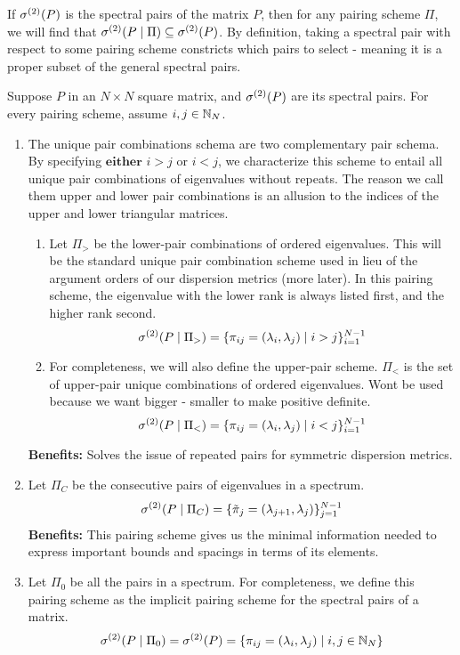 \begin{remark} If ${\sigma^{(2)}}(P)$ is the spectral pairs of the matrix $P$, then for any pairing scheme $\Pi$, we will find that ${\sigma^{(2)}}(P \mid \Pi) \subseteq {\sigma^{(2)}}(P)$. By definition, taking a spectral pair with respect to some pairing scheme constricts which pairs to select - meaning it is a proper subset of the general spectral pairs.
\end{remark}

\newpage
{}

\noindent Suppose $P$ in an $N \times N$ square matrix, and ${\sigma^{(2)}}(P)$ are its spectral pairs. For every pairing scheme, assume $i,j \in \mathbb{N}_N$.

\begin{enumerate}
  \item The unique pair combinations schema are two complementary pair schema. By specifying $\textbf{either}$ $i > j$ or $i < j$, we characterize this scheme to entail all unique pair combinations of eigenvalues without repeats. The reason we call them upper and lower pair combinations is an allusion to the indices of the upper and lower triangular matrices. \begin{enumerate}
    \item Let $\Pi_>$ be the lower-pair combinations of ordered eigenvalues. This will be the standard unique pair combination scheme used in lieu of the argument orders of our dispersion metrics (more later). In this pairing scheme, the eigenvalue with the lower rank is always listed first, and the higher rank second.
    $${\sigma^{(2)}}(P \mid \Pi_>) = \{\pi_{ij} = (\lambda_i,\lambda_j) \mid i > j\}_{i = 1}^{N-1}$$
    \item For completeness, we will also define the upper-pair scheme. $\Pi_<$ is the set of upper-pair unique combinations of ordered eigenvalues. Wont be used because we want bigger - smaller to make positive definite.
    $${\sigma^{(2)}}(P \mid \Pi_<) = \{\pi_{ij} = (\lambda_i,\lambda_j) \mid i < j\}_{i = 1}^{N-1}$$
  \end{enumerate}
  \textbf{Benefits:} Solves the issue of repeated pairs for symmetric dispersion metrics.
\item Let $\Pi_C$ be the consecutive pairs of eigenvalues in a spectrum.
  $${\sigma^{(2)}}(P \mid \Pi_C) = \{{\tilde{\pi}}_{j} = (\lambda_{j + 1},\lambda_j)\}_{j = 1}^{N-1}$$
  \textbf{Benefits:} This pairing scheme gives us the minimal information needed to express important bounds and spacings in terms of its elements.
  \item Let $\Pi_0$ be all the pairs in a spectrum. For completeness, we define this pairing scheme as the implicit pairing scheme for the spectral pairs of a matrix.
  $${\sigma^{(2)}}(P \mid \Pi_0) = {\sigma^{(2)}}(P) = \{\pi_{ij} = (\lambda_{i},\lambda_j) \mid i,j \in \mathbb{N}_N\}$$
\end{enumerate}

